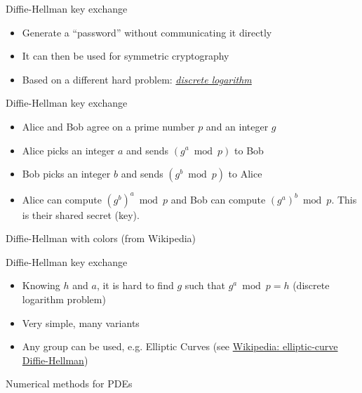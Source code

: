 \documentclass[11pt]{beamer}
\begin{document}
\begin{frame}{Diffie-Hellman key exchange}
	\begin{itemize}
		\item Generate a ``password'' without communicating it directly
		\item It can then be used for symmetric cryptography
		\item Based on a different hard problem:
			\href{https://en.wikipedia.org/wiki/Discrete\_logarithm}%
			{\emph{discrete logarithm}}
	\end{itemize}
\end{frame}

\begin{frame}{Diffie-Hellman key exchange}
	\begin{itemize}
		\item Alice and Bob agree on a prime number $p$ and an integer $g$
		\item Alice picks an integer $a$ and sends $(g^a\bmod p)$ to Bob
		\item Bob picks an integer $b$ and sends $(g^b\bmod p)$ to Alice
		\item Alice can compute $(g^b)^a\bmod p$ and Bob can compute
			$(g^a)^b\bmod p$. This is their shared secret (key).
	\end{itemize}
\end{frame}

\begin{frame}{Diffie-Hellman with colors (from Wikipedia)}
	\begin{center}\end{center}
\end{frame}

\begin{frame}{Diffie-Hellman key exchange}
	\begin{itemize}
		\item Knowing $h$ and $a$, it is hard to find $g$ such that
			$g^a \bmod p =h$ (discrete logarithm problem)
		\item Very simple, many variants
		\item Any group can be used, e.g. Elliptic Curves (see
\href{https://en.wikipedia.org/wiki/Elliptic-curve_Diffie\%E2\%80\%93Hellman}%
			{Wikipedia: elliptic-curve Diffie-Hellman})
	\end{itemize}
\end{frame}


\begin{frame}[plain]
	\begin{center} {\Huge Numerical methods for PDEs} \end{center}
\end{frame}
\end{document}
